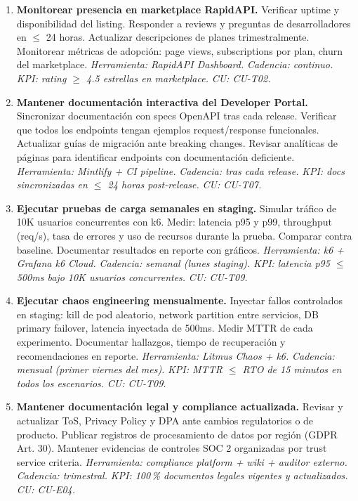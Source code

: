 ﻿\documentclass[11pt, letterpaper]{article}
\begin{document}
\begin{enumerate}[leftmargin=1.5cm, label=\textbf{OP\arabic*}, itemsep=2pt, topsep=4pt]
    \item \textbf{Monitorear presencia en marketplace RapidAPI.} Verificar uptime y disponibilidad del listing. Responder a reviews y preguntas de desarrolladores en $\leq$ 24 horas. Actualizar descripciones de planes trimestralmente. Monitorear métricas de adopción: page views, subscriptions por plan, churn del marketplace. \textit{Herramienta: RapidAPI Dashboard.} \textit{Cadencia: continuo.} \textit{KPI: rating $\geq$ 4.5 estrellas en marketplace.} \textit{CU: CU-T02.}



    \item \textbf{Mantener documentación interactiva del Developer Portal.} Sincronizar documentación con specs OpenAPI tras cada release. Verificar que todos los endpoints tengan ejemplos request/response funcionales. Actualizar guías de migración ante breaking changes. Revisar analíticas de páginas para identificar endpoints con documentación deficiente. \textit{Herramienta: Mintlify + CI pipeline.} \textit{Cadencia: tras cada release.} \textit{KPI: docs sincronizadas en $\leq$ 24 horas post-release.} \textit{CU: CU-T07.}



    \item \textbf{Ejecutar pruebas de carga semanales en staging.} Simular tráfico de 10K usuarios concurrentes con k6. Medir: latencia p95 y p99, throughput (req/s), tasa de errores y uso de recursos durante la prueba. Comparar contra baseline. Documentar resultados en reporte con gráficos. \textit{Herramienta: k6 + Grafana k6 Cloud.} \textit{Cadencia: semanal (lunes staging).} \textit{KPI: latencia p95 $\leq$ 500ms bajo 10K usuarios concurrentes.} \textit{CU: CU-T09.}



    \item \textbf{Ejecutar chaos engineering mensualmente.} Inyectar fallos controlados en staging: kill de pod aleatorio, network partition entre servicios, DB primary failover, latencia inyectada de 500ms. Medir MTTR de cada experimento. Documentar hallazgos, tiempo de recuperación y recomendaciones en reporte. \textit{Herramienta: Litmus Chaos + k6.} \textit{Cadencia: mensual (primer viernes del mes).} \textit{KPI: MTTR $\leq$ RTO de 15 minutos en todos los escenarios.} \textit{CU: CU-T09.}



    \item \textbf{Mantener documentación legal y compliance actualizada.} Revisar y actualizar ToS, Privacy Policy y DPA ante cambios regulatorios o de producto. Publicar registros de procesamiento de datos por región (GDPR Art. 30). Mantener evidencias de controles SOC 2 organizadas por trust service criteria. \textit{Herramienta: compliance platform + wiki + auditor externo.} \textit{Cadencia: trimestral.} \textit{KPI: 100\,\% documentos legales vigentes y actualizados.} \textit{CU: CU-E04.}




\end{enumerate}
\end{document}
